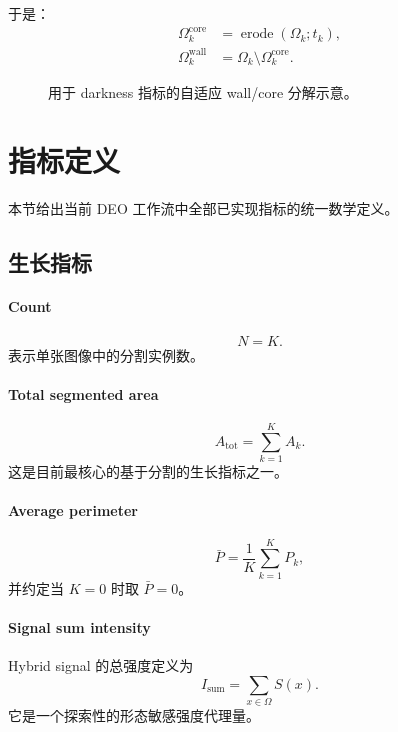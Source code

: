 \documentclass[11pt]{article}
\newcommand{\1}{\mathbf{1}}
\newcommand{\erode}{\operatorname{erode}}
\newcommand{\signal}{S}
\begin{document}
于是：
\begin{align}
\Omega_k^{\mathrm{core}} &= \erode(\Omega_k; t_k),\\
\Omega_k^{\mathrm{wall}} &= \Omega_k \setminus \Omega_k^{\mathrm{core}}.
\end{align}

\begin{figure}[H]
\centering
{}
\caption{用于 darkness 指标的自适应 wall/core 分解示意。}
\end{figure}

\section{指标定义}
本节给出当前 DEO 工作流中全部已实现指标的统一数学定义。

\subsection{生长指标}
\paragraph{Count}
\begin{equation}
N = K.
\end{equation}
表示单张图像中的分割实例数。

\paragraph{Total segmented area}
\begin{equation}
A_{\mathrm{tot}} = \sum_{k=1}^{K} A_k.
\end{equation}
这是目前最核心的基于分割的生长指标之一。

\paragraph{Average perimeter}
\begin{equation}
\bar{P} = \frac{1}{K}\sum_{k=1}^{K} P_k,
\end{equation}
并约定当 $K=0$ 时取 $\bar{P}=0$。

\paragraph{Signal sum intensity}
Hybrid signal 的总强度定义为
\begin{equation}
I_{\mathrm{sum}} = \sum_{x\in\Omega} \signal(x).
\end{equation}
它是一个探索性的形态敏感强度代理量。
\end{document}
